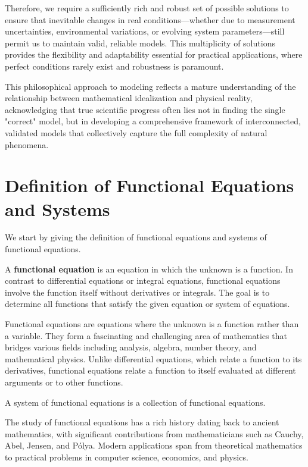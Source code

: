 Therefore, we require a sufficiently rich and robust set of possible solutions to ensure that inevitable changes in real conditions—whether due to measurement uncertainties, environmental variations, or evolving system parameters—still permit us to maintain valid, reliable models. This multiplicity of solutions provides the flexibility and adaptability essential for practical applications, where perfect conditions rarely exist and robustness is paramount.

This philosophical approach to modeling reflects a mature understanding of the relationship between mathematical idealization and physical reality, acknowledging that true scientific progress often lies not in finding the single "correct" model, but in developing a comprehensive framework of interconnected, validated models that collectively capture the full complexity of natural phenomena.

\section{Definition of Functional Equations and Systems}
We start by giving the definition of functional equations and systems of functional equations.
\begin{definition}
A \textbf{functional equation} is an equation in which the unknown is a function. In contrast to differential equations or integral equations, functional equations involve the function itself without derivatives or integrals. The goal is to determine all functions that satisfy the given equation or system of equations.
\end{definition}




Functional equations are equations where the unknown is a function rather than a variable. They form a fascinating and challenging area of mathematics that bridges various fields including analysis, algebra, number theory, and mathematical physics. Unlike differential equations, which relate a function to its derivatives, functional equations relate a function to itself evaluated at different arguments or to other functions.

A system of functional equations is a collection of functional equations.

The study of functional equations has a rich history dating back to ancient mathematics, with significant contributions from mathematicians such as Cauchy, Abel, Jensen, and Pólya. Modern applications span from theoretical mathematics to practical problems in computer science, economics, and physics.

